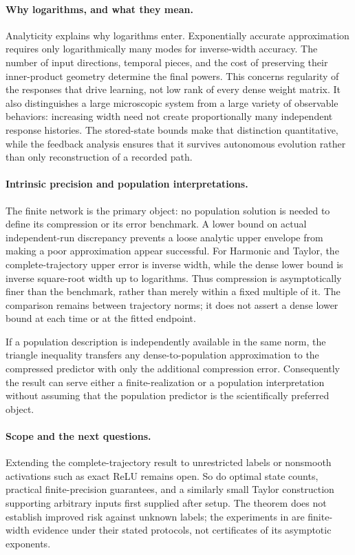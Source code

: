 \documentclass[11pt]{article}
\theoremstyle{definition}
\theoremstyle{remark}
\begin{document}
\paragraph{Why logarithms, and what they mean.}
Analyticity explains why logarithms enter. Exponentially accurate
approximation requires only logarithmically many modes for inverse-width
accuracy. The number of input directions, temporal pieces, and the cost of
preserving their inner-product geometry determine the final powers.
This concerns regularity of the responses that drive learning, not low rank
of every dense weight matrix. It also distinguishes a large microscopic
system from a large variety of observable behaviors: increasing width need
not create proportionally many independent response histories.
The stored-state bounds make that distinction quantitative, while the
feedback analysis ensures that it survives autonomous evolution rather
than only reconstruction of a recorded path.

\paragraph{Intrinsic precision and population interpretations.}
The finite network is the primary object: no population solution is needed
to define its compression or its error benchmark. A lower bound on actual
independent-run discrepancy prevents a loose analytic upper envelope from
making a poor approximation appear successful.
For Harmonic and Taylor, the complete-trajectory upper error is inverse
width, while the dense lower bound is inverse square-root width up to
logarithms. Thus compression is asymptotically finer than the benchmark,
rather than merely within a fixed multiple of it. The comparison remains
between trajectory norms; it does not assert a dense lower bound at each
time or at the fitted endpoint.

If a population description is independently available in the same norm,
the triangle inequality transfers any dense-to-population approximation to
the compressed predictor with only the additional compression error.
Consequently the result can serve either a finite-realization or a
population interpretation without assuming that the population predictor
is the scientifically preferred object.

\paragraph{Scope and the next questions.}
Extending the complete-trajectory result to unrestricted labels or nonsmooth activations
such as exact ReLU remains open. So do optimal state counts, practical
finite-precision guarantees, and a similarly small Taylor construction
supporting arbitrary inputs first supplied after setup. The theorem does
not establish improved risk against unknown labels; the experiments in
 are finite-width evidence under their stated
protocols, not certificates of its asymptotic exponents.
\end{document}
